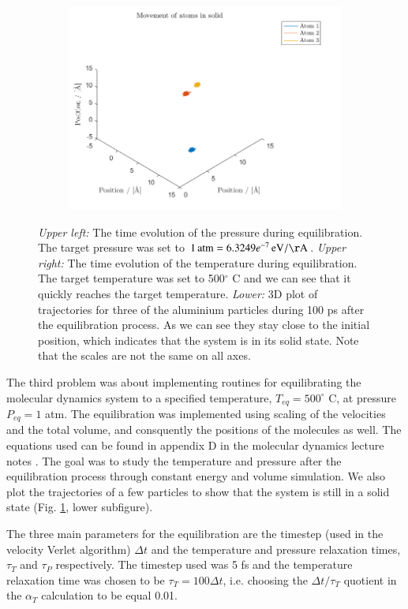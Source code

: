 \begin{figure}[H]
\begin{subfigure}[b]{0.40\textwidth}
        \includegraphics[width=\textwidth]{graphics/task3/traj.png}
    \end{subfigure}
    \caption{\textit{Upper left:} The time evolution of the pressure during equilibration. The target pressure was set to $\unit[1]{atm} = \unit[6.3249e^{-7}]{eV/\AA}$. \textit{Upper right:} The time evolution of the temperature during equilibration. The target temperature was set to 500$^\circ$ C and we can see that it quickly reaches the target temperature. \textit{Lower:} 3D plot of trajectories for three of the aluminium particles during 100 ps after the equilibration process. As we can see they stay close to the initial position, which indicates that the system is in its solid state. Note that the scales are not the same on all axes.}
    \label{fig:equilibrium500}
\end{figure}

The third problem was about implementing routines for equilibrating the molecular dynamics system to a specified temperature, $T_{eq} = 500^\circ$ C, at pressure $P_{eq} = 1$ atm. The equilibration was implemented using scaling of the velocities and the total volume, and consquently the positions of the molecules as well. The equations used can be found in appendix D in the molecular dynamics lecture notes \cite{lecnotes}. The goal was to study the temperature and pressure after the equilibration process through constant energy and volume simulation. We also plot the trajectories of a few particles to show that the system is still in a solid state (Fig. \ref{fig:equilibrium500}, lower subfigure).

The three main parameters for the equilibration are the timestep (used in the velocity Verlet algorithm) $\Delta t$ and the temperature and pressure relaxation times, $\tau_T$ and $\tau_P$ respectively. The timestep used was 5 fs and the temperature relaxation time was chosen to be $\tau_T = 100 \Delta t$, i.e. choosing the $\Delta t/\tau_T$ quotient in the $\alpha_T$ calculation to be equal 0.01.

